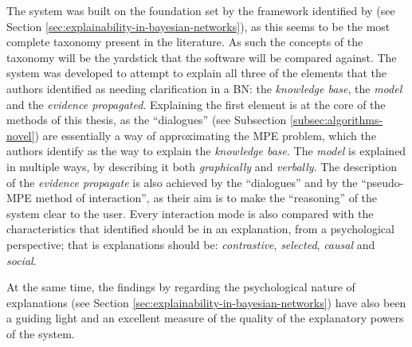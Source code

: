 The system was built on the foundation set by the framework identified by \citet{lacave2002review} (see Section \ref{sec:explainability-in-bayesian-networks}), as this seems to be the most complete taxonomy present in the literature.
As such the concepts of the taxonomy will be the yardstick that the software will be compared against.
The system was developed to attempt to explain all three of the elements that the authors identified as needing clarification in a BN: the \textit{knowledge base}, the \textit{model} and the \textit{evidence propagated}.
Explaining the first element is at the core of the methods of this thesis, as the \enquote{dialogues} (see Subsection \ref{subsec:algorithms-novel}) are essentially a way of approximating the MPE problem, which the authors identify as the way to explain the \textit{knowledge base}.
The \textit{model} is explained in multiple ways, by describing it both \textit{graphically} and \textit{verbally}.
The description of the \textit{evidence propagate} is also achieved by the \enquote{dialogues} and by the \enquote{pseudo-MPE method of interaction}, as their aim is to make the \enquote{reasoning} of the system clear to the user.
Every interaction mode is also compared with the characteristics that \citet{miller2018explanation} identified should be in an explanation, from a psychological perspective; that is explanations should be: \textit{contrastive}, \textit{selected}, \textit{causal} and \textit{social}.

At the same time, the findings by \citet{miller2018explanation} regarding the psychological nature of explanations (see Section \ref{sec:explainability-in-bayesian-networks}) have also been a guiding light and an excellent measure of the quality of the explanatory powers of the system.

